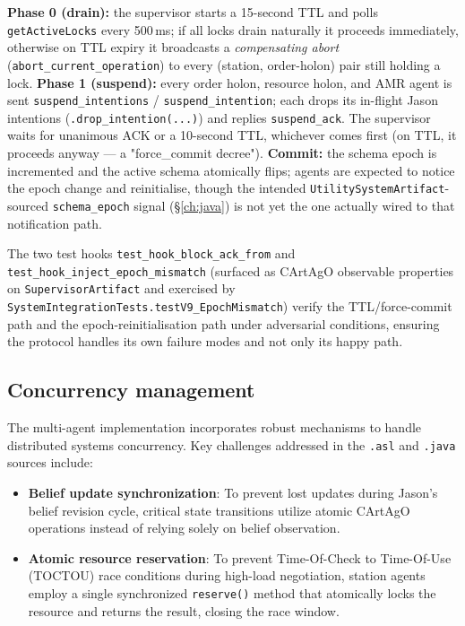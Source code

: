 \documentclass[twocolumn,10pt,a4paper]{article}
\newcommand{\code}[1]{\texttt{\small #1}}
\begin{document}
\textbf{Phase 0 (drain):} the supervisor starts a 15-second TTL and polls \code{getActiveLocks} every 500\,ms; if all locks drain naturally it proceeds immediately, otherwise on TTL expiry it broadcasts a \emph{compensating abort} (\code{abort\_current\_operation}) to every (station, order-holon) pair still holding a lock. \textbf{Phase 1 (suspend):} every order holon, resource holon, and AMR agent is sent \code{suspend\_intentions} / \code{suspend\_intention}; each drops its in-flight Jason intentions (\code{.drop\_intention(...)}) and replies \code{suspend\_ack}. The supervisor waits for unanimous ACK or a 10-second TTL, whichever comes first (on TTL, it proceeds anyway --- a "force\_commit decree"). \textbf{Commit:} the schema epoch is incremented and the active schema atomically flips; agents are expected to notice the epoch change and reinitialise, though the intended \code{UtilitySystemArtifact}-sourced \code{schema\_epoch} signal (\S\ref{ch:java}) is not yet the one actually wired to that notification path.

The two test hooks \code{test\_hook\_block\_ack\_from} and \code{test\_hook\_inject\_epoch\_mismatch} (surfaced as CArtAgO observable properties on \code{SupervisorArtifact} and exercised by \code{SystemIntegrationTests.testV9\_EpochMismatch}) verify the TTL/force-commit path and the epoch-reinitialisation path under adversarial conditions, ensuring the protocol handles its own failure modes and not only its happy path.

\subsection{Concurrency management}
\label{sec:concurrency}
The multi-agent implementation incorporates robust mechanisms to handle distributed systems concurrency. Key challenges addressed in the \code{.asl} and \code{.java} sources include:

\begin{itemize}
\item \textbf{Belief update synchronization}: To prevent lost updates during Jason's belief revision cycle, critical state transitions utilize atomic CArtAgO operations instead of relying solely on belief observation.
\item \textbf{Atomic resource reservation}: To prevent Time-Of-Check to Time-Of-Use (TOCTOU) race conditions during high-load negotiation, station agents employ a single synchronized \code{reserve()} method that atomically locks the resource and returns the result, closing the race window.
\end{itemize}
\end{document}
